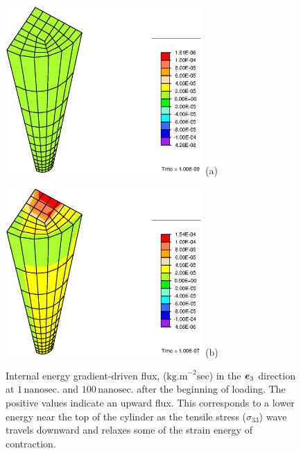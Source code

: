 \begin{figure}[ht]
\begin{minipage}[t]{7.5cm}
{\includegraphics[width=7.5cm]{images/M2-1.eps}} \hskip 3cm (a)
\end{minipage}
\begin{minipage}[t]{7.5cm}
{\includegraphics[width=7.5cm]{images/M2-100.eps}} \hskip 3cm (b)
\end{minipage}
\caption{Internal energy gradient-driven flux,
($\mathrm{kg.m}^{-2}\mathrm{sec}$) in the $\mbox{\boldmath$ e$}_3$ direction at $1
\,\mathrm{nanosec.}$ and $100\,\mathrm{nanosec.}$ after the
beginning of loading. The positive values indicate an upward flux.
This corresponds to a lower energy near the top of the cylinder as
the tensile stress ($\sigma_{33}$) wave travels downward and
relaxes some of the strain energy of contraction.} \label{M2fig}
\end{figure}

